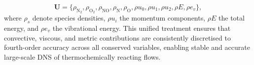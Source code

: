 \begin{equation}
    \mathbf{U} = \{\rho_{\text{N}_2}, \rho_{\text{O}_2}, \rho_{\text{NO}}, \rho_{\text{N}}, \rho_{\text{O}}, \rho u_0, \rho u_1, \rho u_2, \rho E, \rho e_v\},
\end{equation}
where $\rho_s$ denote species densities, $\rho u_i$ the momentum components, $\rho E$ the total energy, and $\rho e_v$ the vibrational energy. This unified treatment ensures that convective, viscous, and metric contributions are consistently discretised to fourth-order accuracy across all conserved variables, enabling stable and accurate large-scale \gls{DNS} of thermochemically reacting flows.





